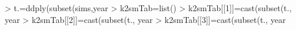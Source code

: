 \documentclass[shortnames,nojss,article]{jss}
\begin{document}
\begin{Schunk}
\begin{Sinput}
> t.=ddply(subset(sims,year %
> k2smTab=list()
> k2smTab[[1]]=cast(subset(t., year %
> k2smTab[[2]]=cast(subset(t., year %
> k2smTab[[3]]=cast(subset(t., year %
\end{Sinput}
\end{Schunk}
\end{document}
